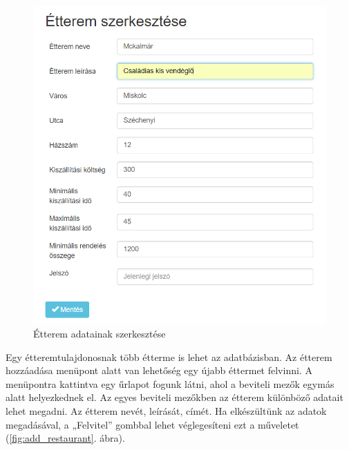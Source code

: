 \begin{figure}
\centering
\includegraphics[scale=0.9]{kepek/edit_restaurant.png}
\caption{Étterem adatainak szerkesztése}
\label{fig:edit_restaurnt}
\end{figure}


Egy étteremtulajdonosnak több étterme is lehet az adatbázisban. Az étterem hozzáadása menüpont alatt van lehetőség egy újabb éttermet felvinni. 
A menüpontra kattintva egy űrlapot fogunk látni, ahol a beviteli mezők egymás alatt helyezkednek el. Az egyes beviteli mezőkben az étterem különböző adatait lehet megadni. Az étterem nevét, leírását, címét. Ha elkészültünk az adatok megadásával, a „Felvitel” gombbal lehet véglegesíteni ezt a műveletet (\ref{fig:add_restaurant}. ábra).

